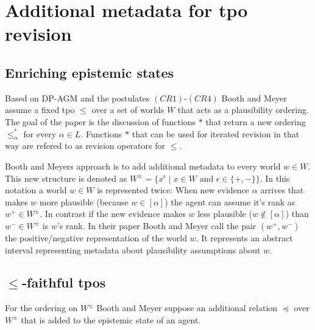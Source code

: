 \documentclass[11pt]{scrartcl}
\theoremstyle{definition}
\theoremstyle{definition}
\begin{document}
\section{Additional metadata for tpo revision}
\subsection{Enriching epistemic states}
Based on DP-AGM and the postulates $(CR1)$-$(CR4)$ Booth and Meyer assume a fixed tpo $\leq$ over a set of worlds $W$ that acts as a plausibility ordering. The goal of the paper is the discussion of functions $\ast$ that return a new ordering $\leq_{\alpha}^{\ast}$ for every $\alpha \in L$. Functions $\ast$ that can be used for iterated revision in that way are refered to as revision operators for $\leq$.

Booth and Meyers \cite{Booth2011} approach is to add additional metadata to every world $w \in W$. This new structure is denoted as $W^{\pm} = \{x^{\epsilon} \mid x \in W \textrm{ and } \epsilon \in \{+, -\}\}$. In this notation a world $w \in W$ is represented twice: When new evidence $\alpha$ arrives that makes $w$ more plausible (because $w \in [\alpha]$) the agent can assume it's rank as $w^{+} \in W^{\pm}$. In contrast if the new evidence makes $w$ less plausible ($w \notin [\alpha]$) than $w^{-} \in W^{\pm}$ is $w$'s rank. In their paper \cite{Booth2011} Booth and Meyer call the pair $(w^{+}, w^{-})$ the positive/negative representation of the world $w$. It represents an abstract interval representing metadata about plausibility assumptions about $w$.

\subsection{$\leq$-faithful tpos}
For the ordering on $W^{\pm}$ Booth and Meyer suppose an additional relation $\preceq$ over $W^{\pm}$ that is added to the epistemic state of an agent.
\end{document}
